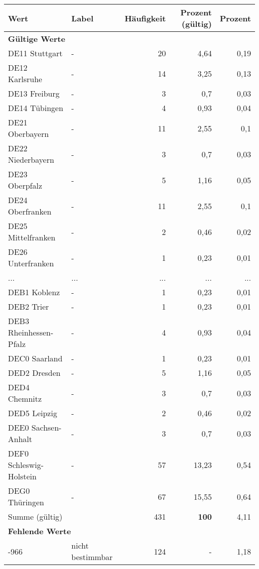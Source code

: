      \begin{longtable}{Xlrrr}
     \toprule
     \textbf{Wert} & \textbf{Label} & \textbf{Häufigkeit} & \textbf{Prozent (gültig)} & \textbf{Prozent} \\
     \endhead
     \midrule
     \multicolumn{5}{l}{\textbf{Gültige Werte}}\\
        \multicolumn{1}{X}{DE11 Stuttgart} & - & 20 & 4,64 & 0,19 \\
        \multicolumn{1}{X}{DE12 Karlsruhe} & - & 14 & 3,25 & 0,13 \\
        \multicolumn{1}{X}{DE13 Freiburg} & - & 3 & 0,7 & 0,03 \\
        \multicolumn{1}{X}{DE14 Tübingen} & - & 4 & 0,93 & 0,04 \\
        \multicolumn{1}{X}{DE21 Oberbayern} & - & 11 & 2,55 & 0,1 \\
        \multicolumn{1}{X}{DE22 Niederbayern} & - & 3 & 0,7 & 0,03 \\
        \multicolumn{1}{X}{DE23 Oberpfalz} & - & 5 & 1,16 & 0,05 \\
        \multicolumn{1}{X}{DE24 Oberfranken} & - & 11 & 2,55 & 0,1 \\
        \multicolumn{1}{X}{DE25 Mittelfranken} & - & 2 & 0,46 & 0,02 \\
        \multicolumn{1}{X}{DE26 Unterfranken} & - & 1 & 0,23 & 0,01 \\
       ... & ... & ... & ... & ... \\
        \multicolumn{1}{X}{DEB1 Koblenz} & - & 1 & 0,23 & 0,01 \\
        \multicolumn{1}{X}{DEB2 Trier} & - & 1 & 0,23 & 0,01 \\
        \multicolumn{1}{X}{DEB3 Rheinhessen-Pfalz} & - & 4 & 0,93 & 0,04 \\
        \multicolumn{1}{X}{DEC0 Saarland} & - & 1 & 0,23 & 0,01 \\
        \multicolumn{1}{X}{DED2 Dresden} & - & 5 & 1,16 & 0,05 \\
        \multicolumn{1}{X}{DED4 Chemnitz} & - & 3 & 0,7 & 0,03 \\
        \multicolumn{1}{X}{DED5 Leipzig} & - & 2 & 0,46 & 0,02 \\
        \multicolumn{1}{X}{DEE0 Sachsen-Anhalt} & - & 3 & 0,7 & 0,03 \\
        \multicolumn{1}{X}{DEF0 Schleswig-Holstein} & - & 57 & 13,23 & 0,54 \\
        \multicolumn{1}{X}{DEG0 Thüringen} & - & 67 & 15,55 & 0,64 \\
     \midrule
      \multicolumn{2}{l}{Summe (gültig)} & 431 &
      \textbf{100} &
         4,11 \\
     \multicolumn{5}{l}{\textbf{Fehlende Werte}}\\
       -966 & nicht bestimmbar & 124 & - & 1,18 \\


\end{longtable}
